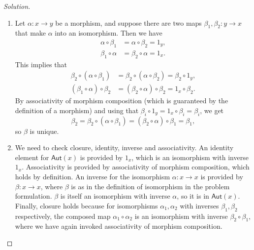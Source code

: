 \begin{proof}[Solution]
\hfill
\begin{enumerate}[font=\normalfont,label=\textbf{(\alph*)}, wide]
\item Let $\alpha: x\to y$ be a morphism, and suppose there are two maps $\beta_1, \beta_2: y \to x$ that make $\alpha$ into an isomorphism. Then we have
\[
\begin{aligned}
\alpha \circ \beta_1 &= \alpha \circ \beta_2 = 1_y, \\
 \beta_1  \circ \alpha&= \beta_2 \circ \alpha  = 1_x.
\end{aligned}
\]
This implies that
\[
\begin{aligned}
\beta_2 \circ ( \alpha \circ \beta_1) &= \beta_2 \circ ( \alpha \circ \beta_2) = \beta_2 \circ 1_y, \\
(\beta_1  \circ \alpha) \circ \beta_2 &= (\beta_2 \circ \alpha) \circ \beta_2  = 1_x \circ \beta_2.
\end{aligned}
\]
By associativity of morphism composition (which is guaranteed by the definition of a morphism) and using that $\beta_i \circ 1_y = 1_x \circ \beta_i = \beta_i$, we get
\[
\beta_2 = \beta_2 \circ( \alpha \circ \beta_1) =  (\beta_2 \circ \alpha) \circ \beta_1 = \beta_1, 
\]
so $\beta$ is unique.

\item We need to check closure, identity, inverse and associativity. An identity element for $\mathsf{Aut}(x)$ is provided by $1_x$, which is an isomorphism with inverse $1_x$. Associativity is provided by associativity of morphism composition, which holds by definition. An inverse for the isomorphism $\alpha: x \to x$ is provided by $\beta: x \to x$, where $\beta$ is as in the definition of isomorphism in the problem formulation. $\beta$ is itself an isomorphism with inverse $\alpha$, so it is in $\mathsf{Aut}(x)$. Finally, closure holds because for isomorphisms $\alpha_1, \alpha_2$ with inverses $\beta_1, \beta_2$ respectively, the composed map $\alpha_1 \circ \alpha_2$ is an isomorphism with inverse $\beta_2 \circ \beta_1$, where we have again invoked associativity of morphism composition.



\end{enumerate}
\end{proof}
